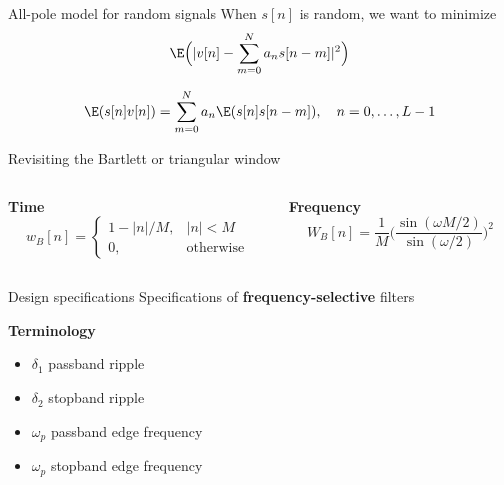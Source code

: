 \begin{frame}{All-pole model for random signals}
When $s[n]$ is random, we want to minimize
\begin{equation*}
\E\Big(|v[n] - \sum_{m = 0}^N a_ns[n-m]|^2\Big)
\end{equation*}



\begin{equation*}
\E(s[n]v[n]) = \sum_{m = 0}^N a_n\E(s[n]s[n-m]), \quad n = 0, \ldots, L-1
\end{equation*}

\end{frame}



%
\begin{frame}{Revisiting the Bartlett or triangular window}
\begin{columns}
	\begin{column}{0.5\textwidth}
		\textbf{Time}
		\begin{equation*}
		w_B[n] = \begin{cases}
		1 - |n|/M, & |n| < M \\
		0, & \text{otherwise}
		\end{cases}
		\end{equation*}
	\end{column}
	
	\begin{column}{0.5\textwidth}
		\textbf{Frequency}
		\begin{equation*}
		W_B[n] = \frac{1}{M}\bigg(\frac{\sin(\omega M/2)}{\sin(\omega/2)}\bigg)^2
		\end{equation*}
	\end{column}
\end{columns}

\hspace*{-0.75cm}\resizebox{0.95\paperwidth}{!}{}
\end{frame}


%
\begin{frame}{Design specifications}
Specifications of \textbf{frequency-selective} filters
\begin{center}
	\resizebox{0.7\linewidth}{!}{}
\end{center}

\textbf{Terminology}
\begin{itemize}
	\item $\delta_1$ passband ripple
	\item $\delta_2$ stopband ripple
	\item $\omega_p$ passband edge frequency
	\item $\omega_p$ stopband edge frequency
\end{itemize}
\end{frame}

